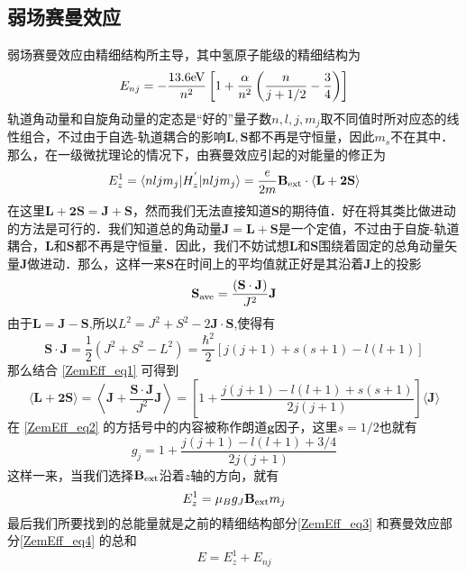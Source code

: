 \subsection{弱场赛曼效应}
弱场赛曼效应由精细结构所主导，其中氢原子能级的精细结构为
\begin{equation}\label{ZemEff_eq3}
E_{nj}=-\frac{13.6\rm{eV}}{n^2}\left[1+\frac{\alpha}{n^2}\left(\frac{n}{j+1/2}-\frac{3}{4}\right)\right]
\end{equation}
轨道角动量和自旋角动量的定态是“好的”量子数$n,l,j,m_j$取不同值时所对应态的线性组合，不过由于自选-轨道耦合的影响$\mathbf{L,S}$都不再是守恒量，因此$m_s$不在其中．那么，在一级微扰理论的情况下，由赛曼效应引起的对能量的修正为
$$
E_z^{1}=\langle nljm_j|H_z^{'}|nljm_j\rangle=\frac{e}{2m}\mathbf{B}_{\rm{ext}}\cdot\langle\mathbf{L+2S}\rangle
$$
在这里$\mathbf{L+2S=J+S}$，然而我们无法直接知道$\mathbf{S}$的期待值．好在将其类比做进动的方法是可行的．我们知道总的角动量$\mathbf{J=L+S}$是一个定值，不过由于自旋-轨道耦合，$\mathbf{L}$和$\mathbf{S}$都不再是守恒量．因此，我们不妨试想$\mathbf{L}$和$\mathbf{S}$围绕着固定的总角动量矢量$\mathbf{J}$做进动．那么，这样一来$\mathbf{S}$在时间上的平均值就正好是其沿着$\mathbf{J}$上的投影
\begin{equation}\label{ZemEff_eq1}
\mathbf{S}_{\rm{ave}}=\frac{(\mathbf{S\cdot J})}{J^2}\mathbf{J}
\end{equation}
由于$\mathbf{L=J-S}$,所以$L^2=J^2+S^2-2\mathbf{J\cdot S}$,使得有
\begin{equation}
\mathbf{S\cdot J}=\frac{1}{2}(J^2+S^2-L^2)=\frac{\hbar^2}{2}[j(j+1)+s(s+1)-l(l+1)]
\end{equation}
那么结合 \autoref{ZemEff_eq1} 可得到
\begin{equation}\label{ZemEff_eq2}
\langle \mathbf{L+2S}\rangle =\left\langle \mathbf{J}+\frac{\mathbf{S\cdot J}}{J^2}\mathbf{J}\right\rangle=\left[1+\frac{j(j+1)-l(l+1)+s(s+1)}{2j(j+1)}\right]\langle\mathbf{J}\rangle
\end{equation}
在 \autoref{ZemEff_eq2} 的方括号中的内容被称作朗道$\mathbf{g}$因子，这里$s=1/2$也就有
\begin{equation}\label{ZemEff_eq15}
g_j=1+\frac{j(j+1)-l(l+1)+3/4}{2j(j+1)}
\end{equation}
这样一来，当我们选择$\mathbf{B}_{\rm{ext}}$沿着$z$轴的方向，就有
\begin{equation}\label{ZemEff_eq4}
E^1_z =\mu_Bg_J\mathbf{B}_{\rm{ext}}m_j
\end{equation}
最后我们所要找到的总能量就是之前的精细结构部分\autoref{ZemEff_eq3} 和赛曼效应部分\autoref{ZemEff_eq4} 的总和
\begin{equation}\label{ZemEff_eq14}
E=E_z^1+E_{nj}
\end{equation}
